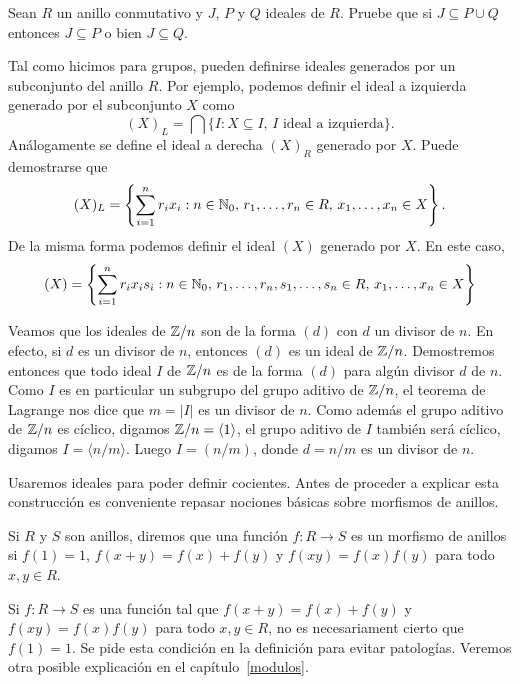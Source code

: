  \begin{exercise}
 \label{xca:PcapQ}
     Sean $R$ un anillo conmutativo y $J$, $P$ y $Q$ ideales de $R$. Pruebe
     que si $J\subseteq P\cup Q$ entonces $J\subseteq P$ o bien $J\subseteq Q$.
 \end{exercise}

Tal como hicimos para grupos, pueden definirse ideales generados por un subconjunto del anillo $R$. Por ejemplo, 
podemos definir el ideal a izquierda generado por el subconjunto $X$ como
\[
(X)_L = \bigcap\{I:X\subseteq I,\,I\text{ ideal a izquierda}\}.
\]
Análogamente se define el ideal a derecha $(X)_R$ generado por $X$.  
Puede demostrarse que
\[
(X)_L=\left\{\sum_{i=1}^nr_ix_i:n\in\mathbb{N}_0,\,r_1,\dots,r_n\in R,\,x_1,\dots,x_n\in X\right\}. 
\]
De la misma forma podemos definir el ideal $(X)$ generado por $X$. En este caso, 
\[
(X) = \left\{\sum_{i=1}^nr_ix_is_i:n\in\mathbb{N}_0,\,r_1,\dots,r_n,s_1,\dots,s_n\in R,\,x_1,\dots,x_n\in X\right\}
\]

\begin{example}
Veamos que los ideales de $\mathbb{Z}/n$ son de la forma $(d)$ con $d$ un divisor de $n$. En efecto, si 
$d$ es un divisor de $n$, entonces $(d)$ es un ideal de $\mathbb{Z}/n$. Demostremos entonces
que todo ideal $I$ de $\mathbb{Z}/n$ es de la forma $(d)$ para algún divisor $d$ de $n$. Como
$I$ es en particular un subgrupo del grupo aditivo de $\mathbb{Z}/n$, el teorema de Lagrange nos dice que 
$m=|I|$ es un divisor de $n$. Como además el grupo
aditivo de $\mathbb{Z}/n$ es cíclico, digamos $\mathbb{Z}/n=\langle 1\rangle$, el grupo aditivo de $I$ también será cíclico, digamos
$I=\langle n/m\rangle$. Luego $I=(n/m)$, donde $d=n/m$ es un divisor de $n$.  
\end{example}

Usaremos ideales para poder definir cocientes. 
Antes de proceder a explicar esta construcción es 
conveniente repasar nociones básicas sobre morfismos de anillos. 

\begin{definition}
Si $R$ y $S$ son anillos, diremos que una función $f\colon R\to S$ es un morfismo de anillos si $f(1)=1$, 
$f(x+y)=f(x)+f(y)$ y $f(xy)=f(x)f(y)$ para todo $x,y\in R$. 	
\end{definition}

Si $f\colon R\to S$ es una función tal que $f(x+y)=f(x)+f(y)$ y $f(xy)=f(x)f(y)$ para todo $x,y\in R$, 
no es necesariament cierto que $f(1)=1$. Se pide esta condición en la definición para evitar patologías. Veremos 
otra posible explicación en el capítulo~\ref{modulos}.

